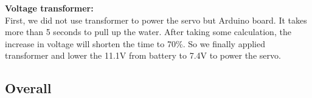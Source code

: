 \bigskip
\noindent
\textbf{Voltage transformer:} \\
\indent
First, we did not use transformer to power the servo but Arduino board.
It takes more than 5 seconds to pull up the water.
After taking some calculation, the increase in voltage will shorten the time to
70\%.
So we finally applied transformer and lower the 11.1V from battery to 7.4V to
power the servo.

\subsection{Overall}